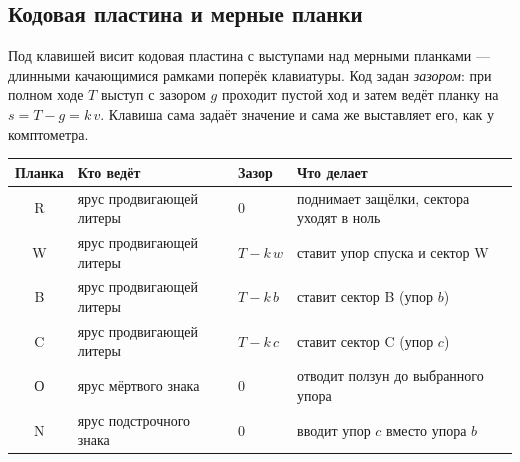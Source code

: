 \subsection{Кодовая пластина и мерные планки}

Под клавишей висит кодовая пластина с выступами над мерными планками — длинными качающимися рамками поперёк клавиатуры. Код задан \emph{зазором}: при полном ходе $T$ выступ с зазором $g$ проходит пустой ход и затем ведёт планку на $s = T - g = k\,v$. Клавиша сама задаёт значение и сама же выставляет его, как у комптометра.

\begin{center}\small
\begin{tabular}{@{}clll@{}}
\toprule
Планка & Кто ведёт & Зазор & Что делает \\
\midrule
R & ярус продвигающей литеры & 0 & поднимает защёлки, сектора уходят в ноль \\
W & ярус продвигающей литеры & $T - k\,w$ & ставит упор спуска и сектор W \\
B & ярус продвигающей литеры & $T - k\,b$ & ставит сектор B (упор $b$) \\
C & ярус продвигающей литеры & $T - k\,c$ & ставит сектор C (упор $c$) \\
О & ярус мёртвого знака & 0 & отводит ползун до выбранного упора \\
N & ярус подстрочного знака & 0 & вводит упор $c$ вместо упора $b$ \\
\bottomrule
\end{tabular}
\end{center}

